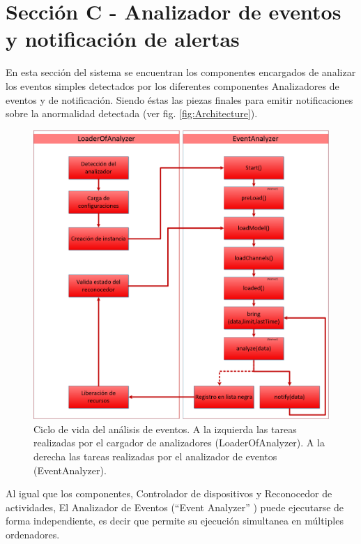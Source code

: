     \newpage

\section{Sección C - Analizador de eventos y notificación de alertas}
\label{Sec:Analyzer}
    En esta sección del sistema se encuentran los componentes encargados de analizar los eventos simples detectados por los diferentes componentes Analizadores de eventos y de notificación. Siendo éstas las piezas finales para emitir notificaciones sobre la anormalidad detectada (ver fig. \ref{fig:Architecture}).
    
        \begin{figure}[ht!]
        	\centering
        	\includegraphics[width=0.9\linewidth]{imgs/03-Architecture/03-AnalyzerLifeCicle.png}
        	\caption[Ciclo de vida del análisis de eventos]{Ciclo de vida del análisis de eventos. A la izquierda las tareas realizadas por el cargador de analizadores (LoaderOfAnalyzer). A la derecha las tareas realizadas por el analizador de eventos (EventAnalyzer).}
    	    \label{fig:AnalyzerLifeCicle}
        \end{figure}%
    
    Al igual que los componentes, Controlador de dispositivos y Reconocedor de actividades, El Analizador de Eventos (``Event Analyzer'' ) puede ejecutarse de forma independiente, es decir que permite su ejecución simultanea en múltiples ordenadores. 
    
